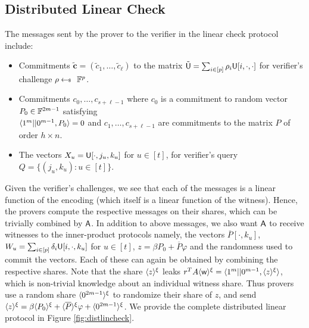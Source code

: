 \subsection{Distributed Linear Check} The messages sent by the prover to the
verifier in the linear check protocol include:
\begin{itemize}
	\item Commitments $\tilde{\bm{c}} = (\tilde{c}_1,\ldots,\tilde{c}_\ell)$ to the matrix $\tilde{\ewit}=
	\sum_{i\in [p]}\rho_i\ewit[i,\cdot,\cdot]$ for verifier's challenge $\rho\sample
	\FF^p$.
	\item Commitments $c_0,\ldots,c_{s+\ell-1}$ where $c_0$ is a commitment to random
	vector $P_0\in \FF^{2m-1}$ satisfying\\ $\innp{1^m||0^{m-1}}{P_0}=0$ and
	$c_1,\ldots,c_{s+\ell-1}$ are commitments to the matrix $P$ of order $h\times n$.
	\item The vectors $X_u=\ewit[\cdot,j_u,k_u]$ for $u\in [t]$, for verifier's
	query $Q=\{(j_u,k_u):u\in [t]\}$.
\end{itemize}
Given the verifier's challenges, we see that each of the messages is a linear function of the encoding (which itself is a linear function of the witness). Hence, the provers compute the respective messages on their shares, which can be trivially
combined by $\Ag$. In addition to above messages, we also want $\Ag$ to receive
witnesses to the inner-product protocols namely, the vectors
$\overline{P}[\cdot,k_u]$, $W_u=\sum_{i\in [p]}\delta_i\ewit[i,\cdot,k_u]$ for
$u\in [t]$, $z=\beta P_0+\overline{P}\varphi$ and the randomness used to commit
the vectors. Each of these can again be obtained by combining the respective shares.
Note that the share $\shr{z}$ leaks $r^TA\shr{\wit}=\innp{1^m||0^{m-1}}{\shr{z}}$, which
is non-trivial knowledge about an individual witness share. Thus provers use a
random share $\shr{0^{2m-1}}$ to randomize their share of $z$, and send
$\shr{z}=\beta\shr{P_0}+\shr{\overline{P}}\varphi+\shr{0^{2m-1}}$. 
We provide the complete distributed linear protocol in Figure
\ref{fig:distlincheck}.%



